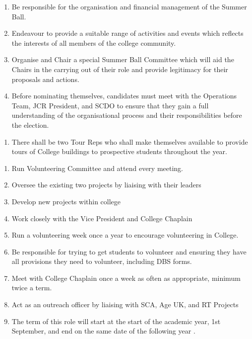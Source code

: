 \begin{enumerate}
    \item Be responsible for the organisation and financial management of the Summer Ball.
    \item Endeavour to provide a suitable range of activities and events which reflects the interests of all members of the college community.
    \item Organise and Chair a special Summer Ball Committee which will aid the Chairs in the carrying out of their role and provide legitimacy for their proposals and actions.
    \item Before nominating themselves, candidates must meet with the Operations Team, JCR President, and SCDO to ensure that they gain a full understanding of the organisational process and their responsibilities before the election.
    
\end{enumerate}

\begin{enumerate}
    \item There shall be two Tour Reps who shall make themselves available to provide tours of College buildings to prospective students throughout the year.
    
\end{enumerate}

\begin{enumerate}
    \item Run Volunteering Committee and attend every meeting.
    \item Oversee the existing two projects by liaising with their leaders 
    \item Develop new projects within college
    \item Work closely with the Vice President and College Chaplain
    \item Run a volunteering week once a year to encourage volunteering in College. 
    \item Be responsible for trying to get students to volunteer and ensuring they have all provisions they need to volunteer, including DBS forms.
    \item Meet with College Chaplain once a week as often as appropriate, minimum twice a term.
    \item Act as an outreach officer by liaising with SCA, Age UK, and RT Projects
    \item The term of this role will start at the start of the academic year, 1st September, and end on the same date of the following year .
    
\end{enumerate}

